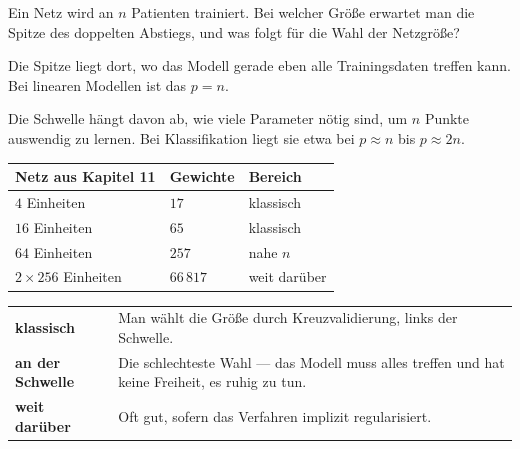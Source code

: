 \begin{aufgabe}
Ein Netz wird an $n$ Patienten trainiert. Bei welcher Größe erwartet man die Spitze des doppelten Abstiegs, und was folgt für die Wahl der Netzgröße?

\loesung
{}
Die Spitze liegt dort, wo das Modell gerade eben alle Trainingsdaten treffen kann. Bei linearen Modellen ist das $p = n$.

Die Schwelle hängt davon ab, wie viele Parameter nötig sind, um $n$ Punkte auswendig zu lernen. Bei Klassifikation liegt sie etwa bei $p \approx n$ bis $p \approx 2n$.

\begin{center}
{\small
\renewcommand{\arraystretch}{1.48}
\begin{tabular}{@{}P{3.4cm}P{2.4cm}P{2.0cm}@{}}
\toprule
\textbf{Netz aus Kapitel 11} & \textbf{Gewichte} & \textbf{Bereich}\\
\midrule
$4$ Einheiten & $17$ & klassisch\\
$16$ Einheiten & $65$ & klassisch\\
$64$ Einheiten & $257$ & nahe $n$\\
$2\times256$ Einheiten & $66\,817$ & weit darüber\\
\bottomrule
\end{tabular}}
\end{center}

\begin{center}
{\small
\renewcommand{\arraystretch}{1.5}
\begin{tabular}{@{}P{2.6cm}P{6.0cm}@{}}
\toprule
\textbf{klassisch} & Man wählt die Größe durch Kreuzvalidierung, links der Schwelle.\\
\textbf{an der Schwelle} & Die schlechteste Wahl --- das Modell muss alles treffen und hat keine Freiheit, es ruhig zu tun.\\
\textbf{weit darüber} & Oft gut, sofern das Verfahren implizit regularisiert.\\
\bottomrule
\end{tabular}}
\end{center}

\begin{center}
\begin{minipage}{0.88\textwidth}
\end{minipage}
\end{center}
\end{aufgabe}

